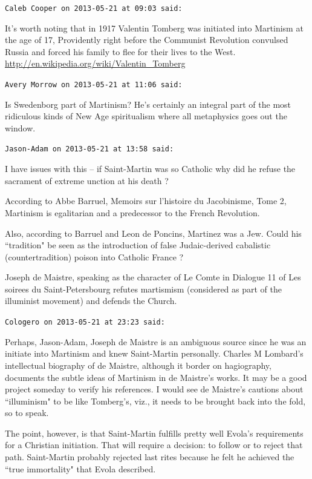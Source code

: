 \begin{footnotesize}\begin{sffamily}

\texttt{Caleb Cooper on 2013-05-21 at 09:03 said: }

It's worth noting that in 1917 Valentin Tomberg was initiated into Martinism at the age of 17, Providently right before the Communist Revolution convulsed Russia and forced his family to flee for their lives to the West. 
\url{http://en.wikipedia.org/wiki/Valentin\_Tomberg}


\hfill

\texttt{Avery Morrow on 2013-05-21 at 11:06 said: }

Is Swedenborg part of Martinism? He's certainly an integral part of the most ridiculous kinds of New Age spiritualism where all metaphysics goes out the window.


\hfill

\texttt{Jason-Adam on 2013-05-21 at 13:58 said: }

I have issues with this – if Saint-Martin was so Catholic why did he refuse the sacrament of extreme unction at his death ? 

According to Abbe Barruel, Memoirs sur l'histoire du Jacobinisme, Tome 2, Martinism is egalitarian and a predecessor to the French Revolution.

Also, according to Barruel and Leon de Poncins, Martinez was a Jew. Could his ``tradition" be seen as the introduction of false Judaic-derived cabalistic (countertradition) poison into Catholic France ?

Joseph de Maistre, speaking as the character of Le Comte in Dialogue 11 of Les soirees du Saint-Petersbourg refutes martismism (considered as part of the illuminist movement) and defends the Church.


\hfill

\texttt{Cologero on 2013-05-21 at 23:23 said: }

Perhaps, Jason-Adam, Joseph de Maistre is an ambiguous source since he was an initiate into Martinism and knew Saint-Martin personally. Charles M Lombard's intellectual biography of de Maistre, although it border on hagiography, documents the subtle ideas of Martinism in de Maistre's works. It may be a good project someday to verify his references. I would see de Maistre's cautions about ``illuminism" to be like Tomberg's, viz., it needs to be brought back into the fold, so to speak.

The point, however, is that Saint-Martin fulfills pretty well Evola's requirements for a Christian initiation. That will require a decision: to follow or to reject that path. Saint-Martin probably rejected last rites because he felt he achieved the ``true immortality" that Evola described.


\end{sffamily}
\end{footnotesize}

